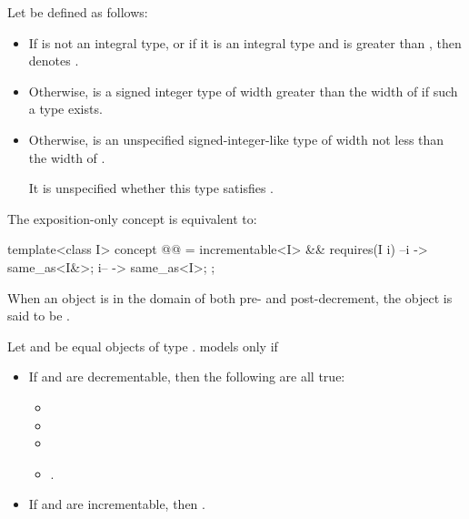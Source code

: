 \pnum
Let  be defined as follows:
\begin{itemize}
\item
  If  is not an integral type, or
  if it is an integral type and 
  is greater than ,
  then  denotes .
\item
  Otherwise, 
  is a signed integer type of width greater than the width of 
  if such a type exists.
\item
  Otherwise, 
  is an unspecified signed-integer-like type
  of width not less than the width of .
  \begin{note}
  It is unspecified
  whether this type satisfies .
  \end{note}
\end{itemize}

\pnum
The exposition-only  concept is equivalent to:
\begin{itemdecl}
template<class I>
  concept @@ =
    incrementable<I> && requires(I i) {
      { --i } -> same_as<I&>;
      { i-- } -> same_as<I>;
    };
\end{itemdecl}

\begin{itemdescr}
\pnum
When an object is in the domain of both pre- and post-decrement,
the object is said to be .

\pnum
Let  and  be equal objects of type .
 models  only if
\begin{itemize}
\item If  and  are decrementable,
  then the following are all true:
  \begin{itemize}
  \item {}
  \item {}
  \item {}
  \item {}.
  \end{itemize}
\item If  and  are incrementable,
  then .
\end{itemize}
\end{itemdescr}

